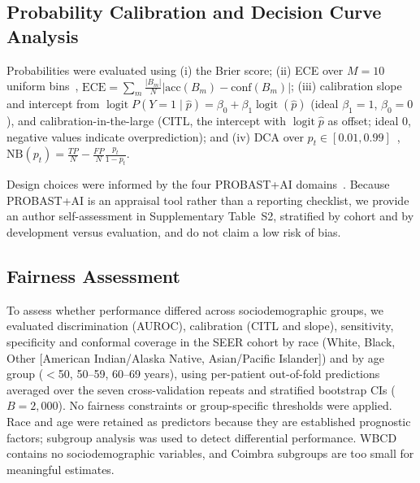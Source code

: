 \documentclass[11pt,a4paper]{article}
\begin{document}
\subsection{Probability Calibration and Decision Curve Analysis}\label{sec:probability-calibration-and-de}
Probabilities were evaluated using (i) the Brier score; (ii) ECE over $M=10$ uniform bins~\cite{vancalster2019}, $\text{ECE}=\sum_m \frac{|B_m|}{N}|\text{acc}(B_m)-\text{conf}(B_m)|$; (iii) calibration slope and intercept from $\operatorname{logit}P(Y=1\mid\hat{p})=\beta_0+\beta_1\operatorname{logit}(\hat{p})$ (ideal $\beta_1=1$, $\beta_0=0$), and calibration-in-the-large (CITL, the intercept with $\operatorname{logit}\hat{p}$ as offset; ideal 0, negative values indicate overprediction); and (iv) DCA over $p_t\in[0.01,0.99]$~\cite{vickers2006}, $\text{NB}(p_t)=\frac{TP}{N}-\frac{FP}{N}\frac{p_t}{1-p_t}$.

Design choices were informed by the four PROBAST+AI domains~\cite{moons2025probast}. Because PROBAST+AI is an appraisal tool rather than a reporting checklist, we provide an author self-assessment in Supplementary Table~S2, stratified by cohort and by development versus evaluation, and do not claim a low risk of bias.

\subsection{Fairness Assessment}\label{sec:fairness-assessment}
To assess whether performance differed across sociodemographic groups, we evaluated discrimination (AUROC), calibration (CITL and slope), sensitivity, specificity and conformal coverage in the SEER cohort by race (White, Black, Other [American Indian/Alaska Native, Asian/Pacific Islander]) and by age group ($<$50, 50--59, 60--69 years), using per-patient out-of-fold predictions averaged over the seven cross-validation repeats and stratified bootstrap CIs ($B=2{,}000$). No fairness constraints or group-specific thresholds were applied. Race and age were retained as predictors because they are established prognostic factors; subgroup analysis was used to detect differential performance. WBCD contains no sociodemographic variables, and Coimbra subgroups are too small for meaningful estimates.
\end{document}

